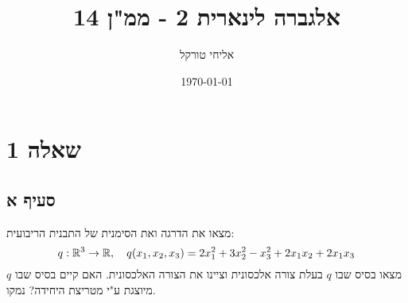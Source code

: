 \documentclass{article}
\title{אלגברה לינארית 2 - ממ"ן 14}
\author{אליחי טורקל \ID}
\date\today
\begin{document}
\maketitle %

\section*{שאלה 1}
\subsection*{סעיף א}
מצאו את הדרגה ואת הסימנית של התבנית הריבועית:
\[
q: \mathbb{R}^3 \rightarrow \mathbb{R}, \quad q(x_1, x_2, x_3) = 2x_1^2 + 3x_2^2 - x_3^2 + 2x_1x_2 + 2x_1x_3
\]
מצאו בסיס שבו $q$ בעלת צורה אלכסונית וציינו את הצורה האלכסונית.
האם קיים בסיס שבו $q$ מיוצגת ע"י מטריצת היחידה? נמקו.
\end{document}
